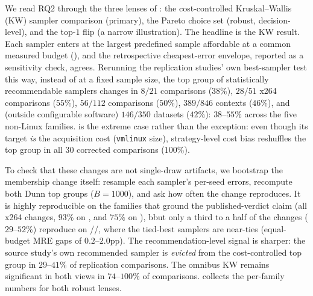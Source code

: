 We read RQ2 through the three lenses of : the
cost-controlled Kruskal--Wallis (KW) sampler comparison (primary), the Pareto
choice set (robust, decision-level), and the top-$1$ flip (a narrow
illustration). The headline is the KW result. Each sampler enters at the largest predefined
sample affordable at a common measured budget (), and the
retrospective cheapest-error envelope, reported as a sensitivity check, agrees. Rerunning the replication studies' own
best-sampler test this way, instead of at a fixed sample size, the top group of
statistically
recommendable samplers changes in $8/21$ \StudyReplicationICSE comparisons
($38\%$), $28/51$ x264 comparisons ($55\%$), $56/112$ \StudyEnergy comparisons
($50\%$), $389/846$ \StudyWorkload contexts ($46\%$), and (outside configurable
software) $146/350$ \StudyLCBench datasets ($42\%$): $38$--$55\%$ across the five
non-Linux families. \StudyLinux is the extreme case rather than the exception:
even though its target \emph{is} the acquisition cost (\texttt{vmlinux} size),
strategy-level cost bias reshuffles the top group in all $30$ corrected
comparisons ($100\%$).

To check that these changes are not single-draw artifacts, we bootstrap the
membership change itself: resample each sampler's per-seed errors, recompute both
Dunn top groups ($B{=}1000$), and ask how often the change reproduces. It is
highly reproducible on the families that ground the published-verdict claim (all
x264 changes, $93\%$ on \StudyLinux, and $75\%$ on \StudyReplicationICSE), bbut
only a third to a half of the changes ($29$--$52\%$) reproduce on
\StudyEnergy/\StudyWorkload/\StudyLCBench, where the tied-best samplers are
near-ties (equal-budget MRE gaps of $0.2$--$2.0$pp). The recommendation-level
signal is sharper: the source study's own recommended sampler is \emph{evicted}
from the cost-controlled top group in $29$--$41\%$ of replication comparisons.
The omnibus KW remains significant in both views in $74$--$100\%$ of comparisons.
 collects the per-family numbers for both robust lenses.

